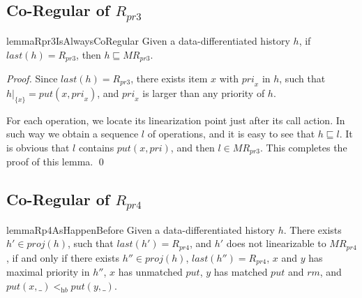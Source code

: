 \subsection{Co-Regular of $R_{\textit{pr3}}$}
\label{subsec:co-regular of Rpr3}


\begin{restatable}{lemma}{Rpr3IsAlwaysCoRegular}
\label{lemma:Rpr3 is always co-regular}
Given a data-differentiated history $h$, if $\textit{last}(h) = R_{\textit{pr3}}$, then $h \sqsubseteq \textit{MR}_{\textit{pr3}}$.
\end{restatable}

\begin {proof}

Since $\textit{last}(h) = R_{\textit{pr3}}$, there exists item $x$ with $\textit{pri}_x$ in $h$, such that $h \vert_{ \{ x \}} = \textit{put}(x,\textit{pri}_x)$, and $\textit{pri}_x$ is larger than any priority of $h$.

For each operation, we locate its linearization point just after its call action. In such way we obtain a sequence $l$ of operations, and it is easy to see that $h \sqsubseteq l$. It is obvious that $l$ contains $\textit{put}(x,\textit{pri})$, and then $l \in \textit{MR}_{\textit{pr3}}$. This completes the proof of this lemma. \qed
\end {proof}



\subsection{Co-Regular of $R_{\textit{pr4}}$}
\label{subsec:co-regular of Rpr4}

\begin{restatable}{lemma}{Rp4AsHappenBefore}
\label{lemma:Rpr4 as happen before}
Given a data-differentiated history $h$. There exists $h' \in \textit{proj}(h)$, such that $\textit{last}(h') = R_{\textit{pr4}}$, and $h'$ does not linearizable to $\textit{MR}_{\textit{pr4}}$, if and only if there exists $h'' \in \textit{proj}(h)$, $\textit{last}(h'') = R_{\textit{pr4}}$, $x$ and $y$ has maximal priority in $h''$, $x$ has unmatched $\textit{put}$, $y$ has matched $\textit{put}$ and $\textit{rm}$, and $\textit{put}(x,\_) <_{\textit{hb}} \textit{put}(y,\_)$.
\end{restatable}

